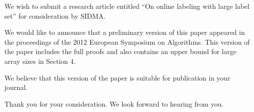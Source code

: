 \documentclass[10pt,stdletter]{newlfm}
\begin{document}
\begin{newlfm}

We wish to submit a research article entitled ``On online labeling with large label set'' for consideration by SIDMA. 

We would like to announce that a preliminary version of this paper appeared in the proceedings of the 2012 European Symposium on Algorithms. This version of the paper includes the full proofs and also contains an upper bound  for  large  array  sizes in Section 4.

We believe that this version of the paper is suitable for publication in your journal.

Thank you for your consideration. 
We look forward to hearing from you.

\end{newlfm}
\end{document}
